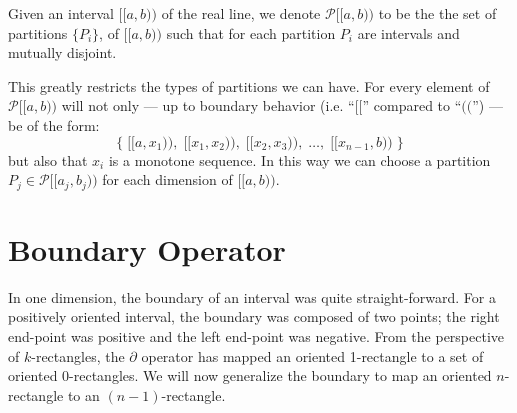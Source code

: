 \begin{definition}
	Given an interval $[\![a,b)\!)$ of the real line, we denote $\mathcal{P}[\![a,b)\!)$ to be the the set of partitions $\{P_i\}$, of $[\![a,b)\!)$ such that for each partition $P_i$ are intervals and mutually disjoint.
\end{definition}

This greatly restricts the types of partitions we can have.
For every element of $\mathcal{P}[\![a,b)\!)$ will not only --- up to boundary behavior  (i.e. ``$[\![$'' compared to ``$(\!($'') --- be of the form:
\begin{equation}
	\Big\{ \; [\![a,x_1)\!), \; [\![x_1, x_2)\!), \; [\![x_2, x_3)\!),\; \ldots,\; [\![x_{n-1}, b)\!) \; \Big\}
\end{equation}
but also that $x_i$ is a monotone sequence.
In this way we can choose a partition $P_j \in \mathcal{P}[\![a_j,b_j)\!)$ for each dimension of $[\![a,b)\!)$.




\section{Boundary Operator}

In one dimension, the boundary of an interval was quite straight-forward.
For a positively oriented interval, the boundary was composed of two points; 
the right end-point was positive and the left end-point was negative.
From the perspective of $k$-rectangles, 
the $\partial$ operator has mapped an oriented 1-rectangle to a set of oriented 0-rectangles.
We will now generalize the boundary to map an oriented $n$-rectangle to an $(n-1)$-rectangle.


